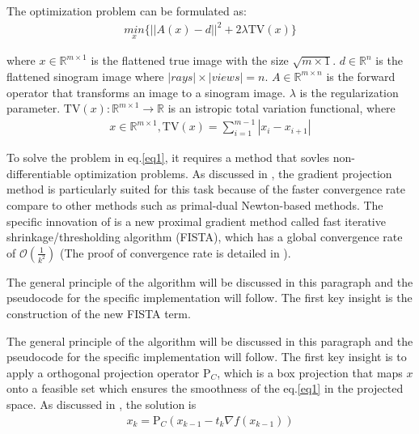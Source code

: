 \documentclass[12pt]{article}
\newcommand{\noin}{\noindent}
\begin{document}
\vspace{0.2in}

\noin The optimization problem can be formulated as:
\begin{align}
 \underset{x}{min}\{ ||A(x) - d||^2 + 2 \lambda\text{TV}(x)\} \label{eq1}
\end{align}

\noin where
$x \in \mathbb{R}^{m \times 1}$ is the flattened true image with the size $\sqrt{m \times 1}$.
$d \in \mathbb{R}^n$ is the flattened sinogram image where $ |rays|\times|views| = n$.
$A \in \mathbb{R}^{m \times n}$ is the forward operator that transforms an image to a sinogram image.
$\lambda$ is the regularization parameter. 
$\text{TV}(x): \mathbb{R}^{m\times 1} \rightarrow \mathbb{R}$  is an istropic total variation functional, where 
\begin{align}
    x \in \mathbb{R}^{m\times 1}, \text{TV}(x) = \sum_{i=1}^{m-1}{|x_i - x_{i+1}|} 
\end{align}

\noin To solve the problem in eq.\ref{eq1}, it requires a method that sovles non-differentiable optimization problems. As discussed in \cite{Beck2009-id}, the gradient projection method is particularly suited for this task because of the faster convergence rate compare to other methods such as primal-dual Newton-based methods\cite{Chan1996-mt}. The specific innovation of \cite{Beck2009-id} is a new proximal gradient method called fast iterative shrinkage/thresholding algorithm (FISTA), which has a global convergence rate of $\mathcal{O}(\frac{1}{k^2})$ (The proof of convergence rate is detailed in \cite{Beck2009-id}). 

\vspace{0.2in}

\noin The general principle of the algorithm will be discussed in this paragraph and the pseudocode for the specific implementation will follow. The first key insight is the construction of the new FISTA term. 

\noin The general principle of the algorithm will be discussed in this paragraph and the pseudocode for the specific implementation will follow. The first key insight is to apply a orthogonal projection operator $\text{P}_C$, which is a box projection that maps $x$ onto a feasible set which ensures the smoothness of the eq.\ref{eq1} in the projected space. As discussed in \cite{Beck2009-id}, the solution is
\begin{align}
    x_k = \text{P}_C(x_{k-1} - t_k\nabla f(x_{k-1}))
\end{align}
\end{document}
